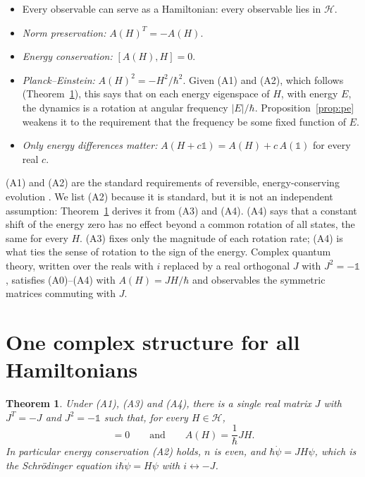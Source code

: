\documentclass[11pt]{article}
\newtheorem{theorem}{Theorem}
\theoremstyle{remark}
\newcommand{\one}{\mathbb{1}}
\begin{document}
\begin{itemize}
\item[(A0)] Every observable can serve as a Hamiltonian: every observable lies in $\mathcal{H}$.
\item[(A1)] \emph{Norm preservation:} $A(H)^{T}=-A(H)$.
\item[(A2)] \emph{Energy conservation:} $[A(H),H]=0$.
\item[(A3)] \emph{Planck--Einstein:} $A(H)^2=-H^2/\hbar^2$. Given (A1) and (A2), which follows (Theorem~\ref{thm:main}), this says that on each energy eigenspace of $H$, with energy $E$, the dynamics is a rotation at angular frequency $|E|/\hbar$. Proposition~\ref{prop:pe} weakens it to the requirement that the frequency be some fixed function of $E$.
\item[(A4)] \emph{Only energy differences matter:} $A(H+c\one)=A(H)+c\,A(\one)$ for every real $c$.
\end{itemize}

(A1) and (A2) are the standard requirements of reversible, energy-conserving evolution \cite{Vaughan}. We list (A2) because it is standard, but it is not an independent assumption: Theorem~\ref{thm:main} derives it from (A3) and (A4). (A4) says that a constant shift of the energy zero has no effect beyond a common rotation of all states, the same for every $H$. (A3) fixes only the magnitude of each rotation rate; (A4) is what ties the sense of rotation to the sign of the energy. Complex quantum theory, written over the reals with $i$ replaced by a real orthogonal $J$ with $J^2=-\one$, satisfies (A0)--(A4) with $A(H)=JH/\hbar$ and observables the symmetric matrices commuting with $J$.

\section{One complex structure for all Hamiltonians}

\begin{theorem}\label{thm:main}
Under (A1), (A3) and (A4), there is a single real matrix $J$ with $J^T=-J$ and $J^2=-\one$ such that, for every $H\in\mathcal{H}$,
\begin{equation}
[J,H]=0 \qquad\text{and}\qquad A(H)=\frac{1}{\hbar}JH .
\end{equation}
In particular energy conservation (A2) holds, $n$ is even, and $\hbar\dot\psi = JH\psi$, which is the Schr\"odinger equation $i\hbar\dot\psi=H\psi$ with $i\leftrightarrow -J$.
\end{theorem}
\end{document}

